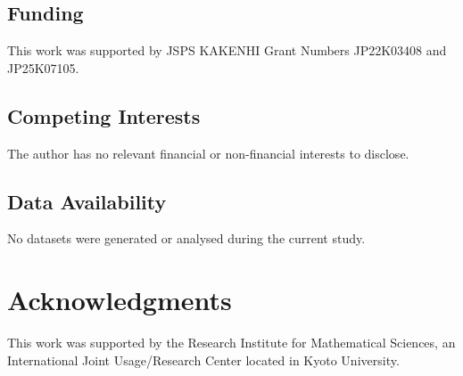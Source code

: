 \documentclass[a4paper,oneside,reqno,12pt]{amsart}
\theoremstyle{plain}
\theoremstyle{definition}
\theoremstyle{remark}
\begin{document}
\subsection*{Funding}

This work was supported by JSPS KAKENHI Grant Numbers
JP22K03408 %
and
JP25K07105. %

\subsection*{Competing Interests}
The author has no relevant financial or non-financial interests to disclose.

\subsection*{Data Availability}
No datasets were generated or analysed during the current study.

\section*{Acknowledgments}

This work was supported by the Research Institute for Mathematical Sciences,
an International Joint Usage/Research Center located in Kyoto University.
\end{document}
